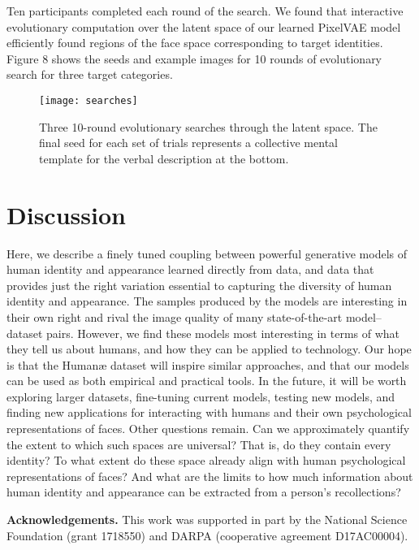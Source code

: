 \documentclass[10pt,letterpaper]{article}
\begin{document}
Ten participants completed each round of the search. We found that interactive evolutionary computation over the latent space of our learned PixelVAE model efficiently found regions of the face space corresponding to target identities. Figure 8 shows the seeds and example images for 10 rounds of evolutionary search for three target categories.

\begin{figure*}[!h]
  \begin{center}
    \texttt{[image: searches]}
  \vspace{-5mm}
  \caption{Three 10-round evolutionary searches through the latent space. The final seed for each set of trials represents a collective mental template for the verbal description at the bottom.}
  \label{searches}
  \end{center}
\vspace{-3mm}
\end{figure*}

\section{Discussion}

Here, we describe a finely tuned coupling between powerful generative models of human identity and appearance learned directly from data, and data that provides just the right variation essential to capturing the diversity of human identity and appearance. The samples produced by the models are interesting in their own right and rival the image quality of many state-of-the-art model--dataset pairs. However, we find these models most interesting in terms of what they tell us about humans, and how they can be applied to technology. Our hope is that the Human{\ae} dataset will inspire similar approaches, and that our models can be used as both empirical and practical tools. In the future, it will be worth exploring larger datasets, fine-tuning current models, testing new models, and finding new applications for interacting with humans and their own psychological representations of faces. Other questions remain. Can we approximately quantify the extent to which such spaces are universal? That is, do they contain every identity? To what extent do these space already align with human psychological representations of faces? And what are the limits to how much information about human identity and appearance can be extracted from a person's recollections?

\vspace{10pt}

\noindent \textbf{Acknowledgements.} This work was supported in part by the National Science Foundation (grant 1718550) and DARPA (cooperative agreement D17AC00004).

\renewcommand{\bibliographytypesize}{\small}

\setlength{\bibleftmargin}{.125in}
\setlength{\bibindent}{-\bibleftmargin}

\end{document}
